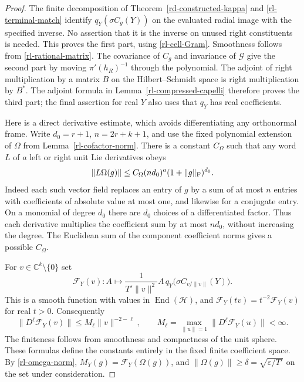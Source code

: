 \begin{proof}
The finite decomposition of Theorem~\ref{rd-constructed-kappa}
and \eqref{rl-terminal-match} identify
$q_Y(\sigma C_g(Y))$ on the evaluated radial image
with the specified inverse.
No assertion that it is the inverse on unused
right constituents is needed.  This proves the first
part, using \eqref{rl-cell-Gram}.
Smoothness follows from \eqref{rl-rational-matrix}.
The covariance of $C_g$ and invariance of $\mathcal G$
give the second part by moving $\pi'(h_R)^{-1}$
through the polynomial.
The adjoint of right multiplication by a matrix $B$
on the Hilbert--Schmidt space is right multiplication
by $B^*$.  The adjoint formula in
Lemma~\ref{rl-compressed-capelli} therefore proves
the third part; the final assertion for real $Y$
also uses that $q_Y$ has real coefficients.

Here is a direct derivative estimate, which avoids
differentiating any orthonormal frame.  Write
$d_0=r+1$, $n=2r+k+1$, and use the fixed polynomial
extension of $\Omega$ from Lemma~\ref{rl-cofactor-norm}.
There is a constant $C_\Omega$ such that any word
$L$ of $a$ left or right unit Lie derivatives obeys
\begin{equation}\label{rl-polynomial-derivative}
               \|L\Omega(g)\|
       \leq C_\Omega(nd_0)^a(1+\|g\|_{\rm F})^{d_0}.
\end{equation}
Indeed each such vector field replaces an entry
of $g$ by a sum of at most $n$ entries with coefficients
of absolute value at most one, and likewise for a
conjugate entry.  On a monomial of degree $d_0$
there are $d_0$ choices of a differentiated factor.
Thus each derivative multiplies the coefficient
sum by at most $nd_0$, without increasing the
degree.  The Euclidean sum of the component coefficient
norms gives a possible $C_\Omega$.

For $v\in\mathbb C^k\setminus\{0\}$ set
\[
 \mathcal F_Y(v):A\longmapsto
       \frac{1}{T'\|v\|^2}
          A\,q_Y\bigl(\sigma C_{v/\|v\|}(Y)\bigr).
\]
This is a smooth function with values in
$\operatorname{End}(\mathcal H)$, and
$\mathcal F_Y(tv)=t^{-2}\mathcal F_Y(v)$ for real $t>0$.
Consequently
\[
 \|D^\ell\mathcal F_Y(v)\|
       \leq M_\ell\|v\|^{-2-\ell},\qquad
 M_\ell=\max_{\|u\|=1}\|D^\ell\mathcal F_Y(u)\|<\infty.
\]
The finiteness follows from smoothness and compactness
of the unit sphere.  These formulas define the
constants entirely in the fixed finite coefficient space.
By \eqref{rl-omega-norm},
$M_Y(g)=\mathcal F_Y(\Omega(g))$, and
$\|\Omega(g)\|\geq\delta=\sqrt{\varepsilon/T'}$
on the set under consideration.


\end{proof}
